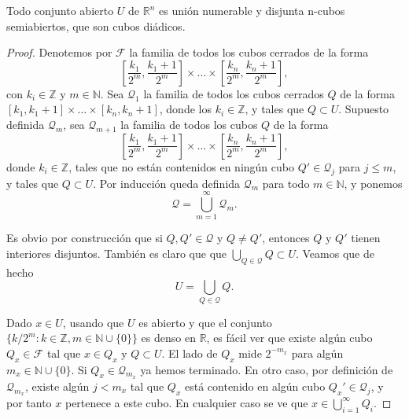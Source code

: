 


\begin{teorema}
    Todo conjunto abierto $U$ de $\mathbb{R}^n$ es unión numerable y disjunta n-cubos semiabiertos, que son cubos diádicos.
\end{teorema}

\begin{proof}
Denotemos por $\mathcal{F}$ la familia de todos los cubos cerrados de la forma
\[
\left[\frac{k_1}{2^m}, \frac{k_1 + 1}{2^m}\right] \times \dots \times \left[\frac{k_n}{2^m}, \frac{k_n + 1}{2^m}\right],
\]
con $k_i \in \mathbb{Z}$ y $m \in \mathbb{N}$. Sea $\mathcal{Q}_1$ la familia de todos los cubos cerrados $Q$ de la forma $[k_1, k_1 + 1] \times \dots \times [k_n, k_n + 1]$, donde los $k_i \in \mathbb{Z}$, y tales que $Q \subset U$. Supuesto definida $\mathcal{Q}_m$, sea $\mathcal{Q}_{m+1}$ la familia de todos los cubos $Q$ de la forma 
\[
\left[\frac{k_1}{2^m}, \frac{k_1+1}{2^m}\right] \times \dots \times \left[\frac{k_n}{2^m}, \frac{k_n+1}{2^m}\right],
\]
donde $k_i \in \mathbb{Z}$, tales que no están contenidos en ningún cubo $Q' \in \mathcal{Q}_j$ para $j \leq m$, y tales que $Q \subset U$. Por inducción queda definida $\mathcal{Q}_m$ para todo $m \in \mathbb{N}$, y ponemos
\[
\mathcal{Q} = \bigcup_{m=1}^{\infty} \mathcal{Q}_m.
\]

Es obvio por construcción que si $Q, Q' \in \mathcal{Q}$ y $Q \neq Q'$, entonces $Q$ y $Q'$ tienen interiores disjuntos. También es claro que que $\bigcup_{Q \in \mathcal{Q}} Q \subset U$. Veamos que de hecho
\[
U = \bigcup_{Q \in \mathcal{Q}} Q.
\]

Dado $x \in U$, usando que $U$ es abierto y que el conjunto $\{k/2^m : k \in \mathbb{Z}, m \in \mathbb{N} \cup \{0\}\}$ es denso en $\mathbb{R}$, es fácil ver que existe algún cubo $Q_x \in \mathcal{F}$ tal que $x \in Q_x$ y $Q \subset U$. El lado de $Q_x$ mide $2^{-m_x}$ para algún $m_x \in \mathbb{N} \cup \{0\}$. Si $Q_x \in \mathcal{Q}_{m_x}$ ya hemos terminado. En otro caso, por definición de $\mathcal{Q}_{m_x}$, existe algún $j < m_x$ tal que $Q_x$ está contenido en algún cubo $Q_x' \in \mathcal{Q}_j$, y por tanto $x$ pertenece a este cubo. En cualquier caso se ve que $x \in \bigcup_{i=1}^{\infty} Q_i$. 
\end{proof}

